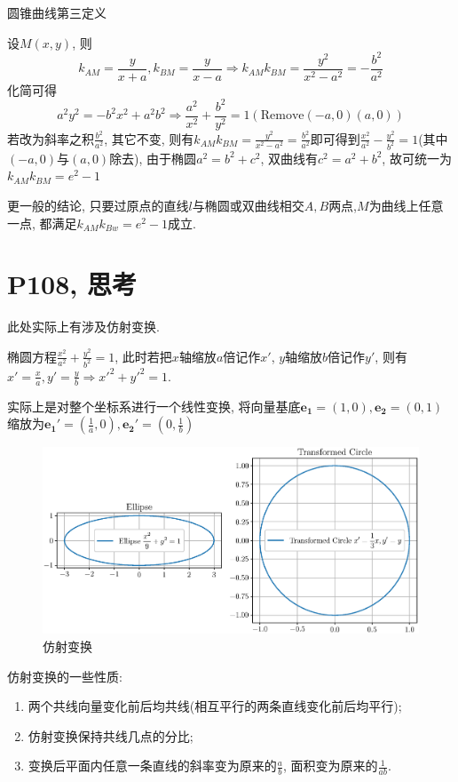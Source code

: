 \documentclass{book}
\begin{document}
    \textcolor[rgb]{0.38,0.11,0.2}{圆锥曲线第三定义}

    设$M(x,y)$, 则$$k_{AM}=\frac{y}{x+a},k_{BM}=\frac{y}{x-a}\Longrightarrow k_{AM}k_{BM}=\frac{y^2}{x^2-a^2}=-\frac{b^2}{a^2}$$
    化简可得$$a^2y^2=-b^2x^2+a^2b^2\Longrightarrow \frac{a^2}{x^2}+\frac{b^2}{y^2}=1(\mathrm{Remove} (-a,0)(a,0))$$
    若改为斜率之积$\frac{b^2}{a^2}$, 其它不变, 则有$\displaystyle k_{AM}k_{BM}=\frac{y^2}{x^2-a^2}=\frac{b^2}{a^2}$即可得到$\displaystyle \frac{x^2}{a^2}-\frac{y^2}{b^2}=1$(其中$(-a,0)$与$(a,0)$除去), 由于椭圆$a^2=b^2+c^2$, 双曲线有$c^2=a^2+b^2$, 故可\textcolor[rgb]{0.75,0.17,0.22}{统一为$k_{AM}k_{BM}=e^2-1$}

    更一般的结论, 只要过原点的直线$l$与椭圆或双曲线相交$A,B$两点,$M$为曲线上任意一点, 都满足$k_{AM}k_{Bw}=e^2-1$成立.
    \section{\textcolor[rgb]{0.11,0.65,0.52}{P108, 思考}}
    此处实际上有涉及\textcolor[rgb]{0.38,0.11,0.2}{仿射变换}.

    椭圆方程$\displaystyle \frac{x^2}{a^2}+\frac{y^2}{b^2}=1$, 此时若\textcolor[rgb]{0.75,0.17,0.22}{把$x$轴缩放$a$倍记作$x'$, $y$轴缩放$b$倍记作$y'$}, 则有$\displaystyle x'=\frac{x}{a},y'=\frac{y}{b}\Longrightarrow x'^2+y'^2=1$.

    实际上是对整个坐标系进行一个线性变换, 将向量基底$\boldsymbol{e_1}=(1,0),\boldsymbol{e_2}=(0,1)$缩放为$\displaystyle \boldsymbol{e_1'}=(\frac{1}{a},0),\boldsymbol{e_2'}=(0,\frac{1}{b})$

    \begin{figure}[htbp]
        \centering
        \includegraphics[width=\textwidth]{img/AffineTransform.eps}
        \caption{仿射变换}
    \end{figure}

    仿射变换的一些性质:
    \begin{enumerate}
        \item 两个共线向量变化前后均共线(相互平行的两条直线变化前后均平行);
        \item 仿射变换保持共线几点的分比;
        \item 变换后平面内任意一条直线的斜率变为原来的$\displaystyle \frac{a}{b}$, 面积变为原来的$\displaystyle \frac{1}{ab}$.
    \end{enumerate}
\end{document}
